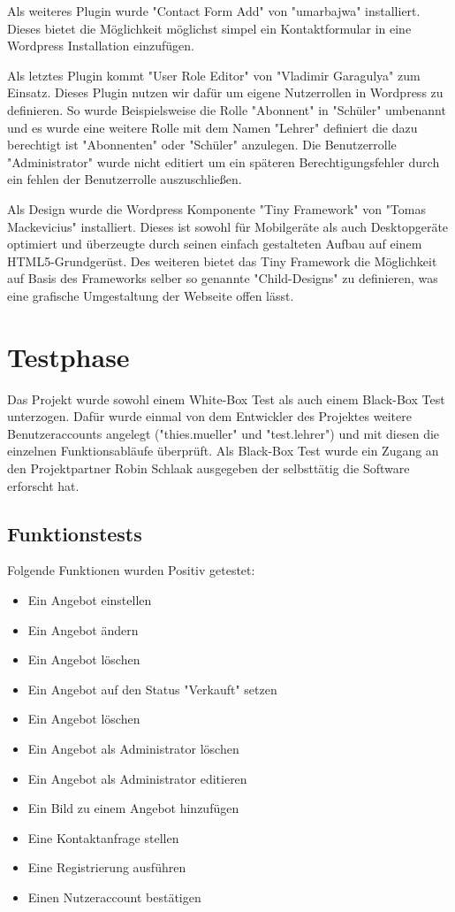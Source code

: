 \documentclass[a4paper, DIV20, 11pt, headsepline, parskip]{article}
\begin{document}
Als weiteres Plugin wurde "Contact Form Add" von "umarbajwa" installiert.
Dieses bietet die Möglichkeit möglichst simpel ein Kontaktformular in eine Wordpress Installation einzufügen.

Als letztes Plugin kommt "User Role Editor" von "Vladimir Garagulya" zum Einsatz.
Dieses Plugin nutzen wir dafür um eigene Nutzerrollen in Wordpress zu definieren.
So wurde Beispielsweise die Rolle "Abonnent" in "Schüler" umbenannt und es wurde eine weitere Rolle mit dem Namen "Lehrer" definiert die dazu berechtigt ist "Abonnenten" oder "Schüler" anzulegen.
Die Benutzerrolle "Administrator" wurde nicht editiert um ein späteren Berechtigungsfehler durch ein fehlen der Benutzerrolle auszuschließen.

Als Design wurde die Wordpress Komponente "Tiny Framework" von "Tomas Mackevicius" installiert.
Dieses ist sowohl für Mobilgeräte als auch Desktopgeräte optimiert und überzeugte durch seinen einfach gestalteten Aufbau auf einem HTML5-Grundgerüst.
Des weiteren bietet das Tiny Framework die Möglichkeit auf Basis des Frameworks selber so genannte "Child-Designs" zu definieren, was eine grafische Umgestaltung der Webseite offen lässt.
\section{Testphase}
Das Projekt wurde sowohl einem White-Box Test als auch einem Black-Box Test unterzogen.
Dafür wurde einmal von dem Entwickler des Projektes weitere Benutzeraccounts angelegt ("thies.mueller" und "test.lehrer") und mit diesen die einzelnen Funktionsabläufe überprüft.
Als Black-Box Test wurde ein Zugang an den Projektpartner Robin Schlaak ausgegeben der selbsttätig die Software erforscht hat.
\subsection{Funktionstests}
Folgende Funktionen wurden Positiv getestet:
\begin{itemize}
\item Ein Angebot einstellen
\item Ein Angebot ändern
\item Ein Angebot löschen
\item Ein Angebot auf den Status "Verkauft" setzen
\item Ein Angebot löschen
\item Ein Angebot als Administrator löschen
\item Ein Angebot als Administrator editieren
\item Ein Bild zu einem Angebot hinzufügen
\item Eine Kontaktanfrage stellen
\item Eine Registrierung ausführen
\item Einen Nutzeraccount bestätigen
\end{itemize}
\end{document}
